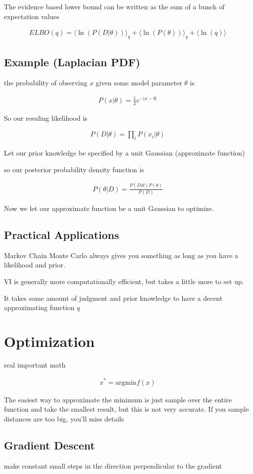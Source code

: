 \documentclass[fleqn]{report}
\newcommand{\equations} [1] {
\begin{gather*}
#1
\end{gather*}
}
\begin{document}
The evidence based lower bound can be written as the sum 
of a bunch of expectation values 
\equations{
    ELBO(q)
    =
    \langle 
        \ln(P(D | \theta))
    \rangle_q 
    +
    \langle 
        \ln(P(\theta))
    \rangle_q
    +
    \langle 
        \ln(q)
    \rangle 
}

\subsection{Example (Laplacian PDF)}
the probability of observing $x$ given some model parameter $\theta$ is 
\equations{
    P(x | \theta)
    = 
    \frac{1}{2}
    e^{-|x - \theta|}
}

So our resuling likelihood is 
\equations{
    P(D | \theta)
    =
    \prod_i P(x_i | \theta)
}

Let our prior knowledge be specified by a unit Gaussian (approximate 
function)

so our posterior probability density function is 
\equations{
    P(\theta | D)
    =
    \frac{P(D | \theta)P(\theta)}{P(D)}
}

Now we let our approximate function be a unit Gaussian to optimize. 

\subsection{Practical Applications}
Markov Chain Monte Carlo always gives you something 
as long as you have a likelihood and prior. 

VI is generally more computationally efficient, but takes a little more 
to set up. 

It takes some amount of judgment and prior knowledge to have a decent 
approximating function $q$

\section{Optimization}
real important math 

\equations{
    x^* = \textrm{argmin} f(x)
}

The easiest way to approximate the minimum is just sample 
over the entire function and take the smallest result, but this 
is not very accurate. If you sample distances are too big, you'll miss details 

\subsection{Gradient Descent}
make constant small steps in the direction perpendicular to the gradient 
\end{document}
